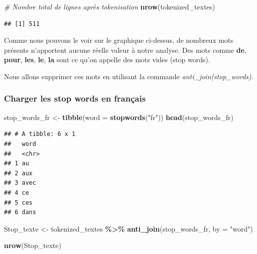 \documentclass[
]{article}
\newenvironment{Shaded}{\begin{snugshade}}{\end{snugshade}}
\newcommand{\AttributeTok}[1]{\textcolor[rgb]{0.13,0.29,0.53}{#1}}
\newcommand{\CommentTok}[1]{\textcolor[rgb]{0.56,0.35,0.01}{\textit{#1}}}
\newcommand{\FunctionTok}[1]{\textcolor[rgb]{0.13,0.29,0.53}{\textbf{#1}}}
\newcommand{\NormalTok}[1]{#1}
\newcommand{\OtherTok}[1]{\textcolor[rgb]{0.56,0.35,0.01}{#1}}
\newcommand{\SpecialCharTok}[1]{\textcolor[rgb]{0.81,0.36,0.00}{\textbf{#1}}}
\newcommand{\StringTok}[1]{\textcolor[rgb]{0.31,0.60,0.02}{#1}}
\begin{document}
\begin{Shaded}
\begin{Highlighting}[]
\CommentTok{\# Nombre total de lignes après tokenisation}
\FunctionTok{nrow}\NormalTok{(tokenized\_textes)}
\end{Highlighting}
\end{Shaded}

\begin{verbatim}
## [1] 511
\end{verbatim}

Comme nous pouvons le voir sur le graphique ci-dessus, de nombreux mots
présents n'apportent aucune réelle valeur à notre analyse. Des mots
comme \textbf{de}, \textbf{pour}, \textbf{les}, \textbf{le}, \textbf{la}
sont ce qu'on appelle des mots vides (stop words).

Nous allons supprimer ces mots en utilisant la commande
\emph{anti\_join(stop\_words)}.

\subsubsection{Charger les stop words en
français}\label{charger-les-stop-words-en-franuxe7ais}

\begin{Shaded}
\begin{Highlighting}[]
\NormalTok{stop\_words\_fr }\OtherTok{\textless{}{-}} \FunctionTok{tibble}\NormalTok{(}\AttributeTok{word =} \FunctionTok{stopwords}\NormalTok{(}\StringTok{"fr"}\NormalTok{)) }
\FunctionTok{head}\NormalTok{(stop\_words\_fr)}
\end{Highlighting}
\end{Shaded}

\begin{verbatim}
## # A tibble: 6 x 1
##   word 
##   <chr>
## 1 au   
## 2 aux  
## 3 avec 
## 4 ce   
## 5 ces  
## 6 dans
\end{verbatim}

\begin{Shaded}
\begin{Highlighting}[]
\NormalTok{Stop\_texte }\OtherTok{\textless{}{-}}\NormalTok{ tokenized\_textes }\SpecialCharTok{\%\textgreater{}\%} 
  \FunctionTok{anti\_join}\NormalTok{(stop\_words\_fr, }\AttributeTok{by =} \StringTok{"word"}\NormalTok{)}

\FunctionTok{nrow}\NormalTok{(Stop\_texte)}
\end{Highlighting}
\end{Shaded}
\end{document}
